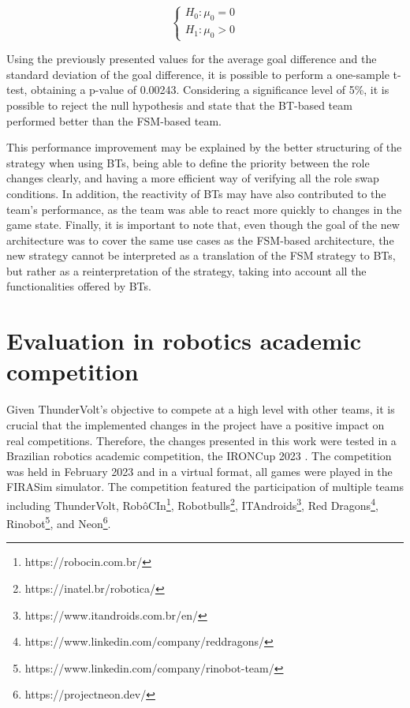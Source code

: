 \begin{equation}
    \left\{
    \begin{aligned}
        H_0: \mu_0 = 0 \\
        H_1: \mu_0 > 0
    \end{aligned}
    \right.
    \label{eq:average_goals_diff_hypothesis}
\end{equation}

Using the previously presented values for the average goal difference and the standard deviation of the goal difference, it is possible to perform a one-sample t-test, obtaining a p-value of 0.00243. Considering a significance level of 5\%, it is possible to reject the null hypothesis and state that the BT-based team performed better than the FSM-based team.

This performance improvement may be explained by the better structuring of the strategy when using BTs, being able to define the priority between the role changes clearly, and having a more efficient way of verifying all the role swap conditions. In addition, the reactivity of BTs may have also contributed to the team's performance, as the team was able to react more quickly to changes in the game state. Finally, it is important to note that, even though the goal of the new architecture was to cover the same use cases as the FSM-based architecture, the new strategy cannot be interpreted as a translation of the FSM strategy to BTs, but rather as a reinterpretation of the strategy, taking into account all the functionalities offered by BTs.

\section{Evaluation in robotics academic competition}

Given ThunderVolt's objective to compete at a high level with other teams, it is crucial that the implemented changes in the project have a positive impact on real competitions. Therefore, the changes presented in this work were tested in a Brazilian robotics academic competition, the IRONCup 2023 \cite{IRONCup2023}. The competition was held in February 2023 and in a virtual format, all games were played in the FIRASim simulator. The competition featured the participation of multiple teams including ThunderVolt, RobôCIn\footnote{https://robocin.com.br/}, Robotbulls\footnote{https://inatel.br/robotica/}, ITAndroids\footnote{https://www.itandroids.com.br/en/}, Red Dragons\footnote{https://www.linkedin.com/company/reddragons/}, Rinobot\footnote{https://www.linkedin.com/company/rinobot-team/}, and Neon\footnote{https://projectneon.dev/}.

